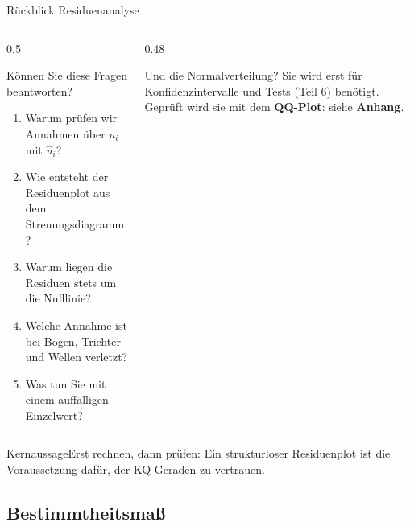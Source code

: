 \documentclass[aspectratio=169,11pt]{beamer}
\newcommand{\kernaussage}[1]{\begin{alertblock}{Kernaussage}#1\end{alertblock}}
\begin{document}
\begin{frame}{Rückblick Residuenanalyse}
  \small
  \begin{columns}[T]
    \begin{column}{0.5\textwidth}
      \begin{block}{Können Sie diese Fragen beantworten?}
        \begin{enumerate}
          \setlength{\itemsep}{1pt}
          \item Warum prüfen wir Annahmen über $u_i$ mit $\hat{u}_i$?
          \item Wie entsteht der Residuenplot aus dem Streuungsdiagramm?
          \item Warum liegen die Residuen stets um die Nulllinie?
          \item Welche Annahme ist bei Bogen, Trichter und Wellen verletzt?
          \item Was tun Sie mit einem auffälligen Einzelwert?
        \end{enumerate}
      \end{block}
    \end{column}
    \begin{column}{0.48\textwidth}
      \begin{exampleblock}{Und die Normalverteilung?}
        Sie wird erst für Konfidenzintervalle und Tests (Teil 6) benötigt.
        Geprüft wird sie mit dem \textbf{QQ-Plot}: siehe \textbf{Anhang}.
      \end{exampleblock}
    \end{column}
  \end{columns}

  \kernaussage{Erst rechnen, dann prüfen: Ein strukturloser Residuenplot ist die
    Voraussetzung dafür, der KQ-Geraden zu vertrauen.}
\end{frame}

\subsection{Bestimmtheitsmaß}
\end{document}
